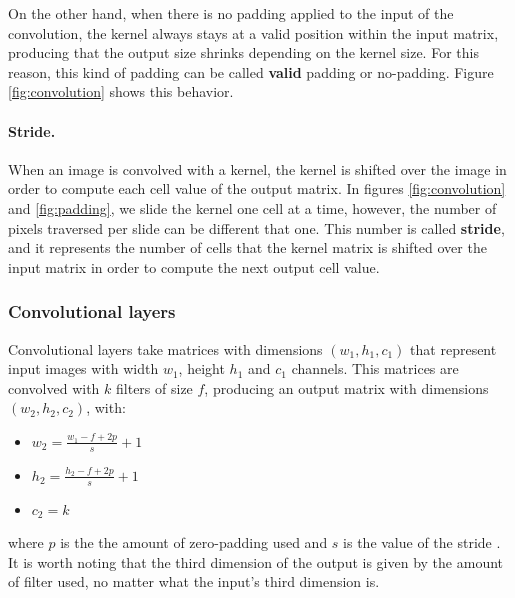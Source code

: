 On the other hand, when there is no padding applied to the input of the convolution, the kernel always stays at a valid position within the input matrix, producing that the output size shrinks depending on the kernel size. For this reason, this kind of padding can be called \textbf{valid} padding or no-padding. Figure \ref{fig:convolution} shows this behavior.

\paragraph{Stride.}
When an image is convolved with a kernel, the kernel is shifted over the image in order to compute each cell value of the output matrix. In figures \ref{fig:convolution} and \ref{fig:padding}, we slide the kernel one cell at a time, however, the number of pixels traversed per slide can be different that one. This number is called \textbf{stride}, and it represents the number of cells that the kernel matrix is shifted over the input matrix in order to compute the next output cell value.

\subsubsection*{Convolutional layers}
Convolutional layers take matrices with dimensions $(w_1, h_1, c_1)$ that represent input images with width $w_1$, height $h_1$ and $c_1$ channels. This matrices are convolved with $k$ filters of size $f$, producing an output matrix with dimensions $(w_2, h_2, c_2)$, with:

\begin{itemize}
	\item $w_2 = \frac{w_1 - f + 2p}{s} + 1$
	\item $h_2 = \frac{h_2 - f + 2p}{s} + 1$
	\item $c_2 = k$
\end{itemize}
where $p$ is the the amount of zero-padding used and $s$ is the value of the stride \cite{STANFORD}. It is worth noting that the third dimension of the output is given by the amount of filter used, no matter what the input's third dimension is.

